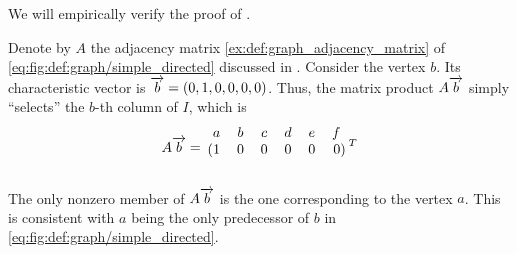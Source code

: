 \begin{example}\label{ex:thm:graphs_as_linear_transformations}
  We will empirically verify the proof of .

  Denote by \( A \) the adjacency matrix \eqref{ex:def:graph_adjacency_matrix} of \eqref{eq:fig:def:graph/simple_directed} discussed in . Consider the vertex \( b \). Its characteristic vector is \( \overrightarrow{b} = (0, 1, 0, 0, 0, 0) \). Thus, the matrix product \( A \overrightarrow{b} \) simply \enquote{selects} the \( b \)-th column of \( I \), which is
  \begin{equation*}
    A \vect{b}
    =
    \begin{blockarray}{cccccrl}
      a        & b        & c        & d        & e        & f \\
    \begin{block}{(cccccr)l}
      1        & 0        & 0        & 0        & 0        & 0 \\
    \end{block}
    \end{blockarray}
    {}^T
  \end{equation*}

  The only nonzero member of \( A \overrightarrow{b} \) is the one corresponding to the vertex \( a \). This is consistent with \( a \) being the only predecessor of \( b \) in \eqref{eq:fig:def:graph/simple_directed}.
\end{example}

